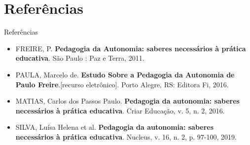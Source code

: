 \documentclass[12pt]{beamer}
\begin{document}
\section{Referências}

\begin{frame}{Referências}
	
	\begin{itemize}
		\justifying
		\item FREIRE, P. \textbf{Pedagogia da Autonomia: saberes necessários à prática educativa}. São Paulo : Paz e Terra, 2011.
		
		\item PAULA, Marcelo de. \textbf{Estudo Sobre a Pedagogia da Autonomia de Paulo Freire}.[recurso eletrônico]. Porto Alegre, RS: Editora Fi, 2016. 
		
		\item MATIAS, Carlos dos Passos Paulo. \textbf{Pedagogia da autonomia: saberes necessários à prática educativa}. Criar Educação, v. 5, n. 2, 2016.
		
		\item SILVA, Luísa Helena et al. \textbf{Pedagogia da autonomia: saberes necessários à prática educativa}. Nucleus, v. 16, n. 2, p. 97-100, 2019.
		
	\end{itemize}
\end{frame}
\end{document}
